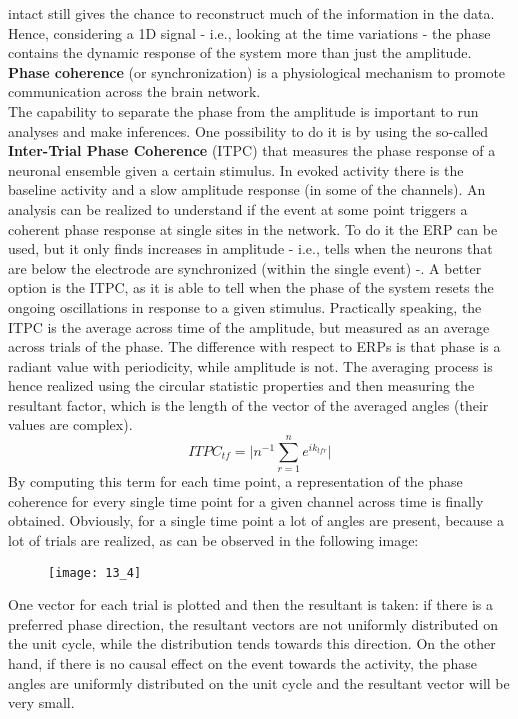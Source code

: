intact still gives the chance to reconstruct much of the information in the data.\\
Hence, considering a 1D signal - i.e., looking at the time variations - the phase
contains the dynamic response of the system more than just the amplitude.
\textbf{Phase coherence} (or synchronization) is a physiological mechanism to promote
communication across the brain network.\\
The capability to separate the phase from the amplitude is important to run analyses
and make inferences.
One possibility to do it is by using the so-called \textbf{Inter-Trial Phase Coherence}
(ITPC) that measures the phase response of a neuronal ensemble given a certain stimulus.
In evoked activity there is the baseline activity and a slow amplitude response (in
some of the channels). An analysis can be realized to understand if the event at some
point triggers a coherent phase response at single sites in the network.
To do it the ERP can be used, but it only finds increases in amplitude - i.e., tells
when the neurons that are below the electrode are synchronized (within the single
event) -. A better option is the ITPC, as it is able to tell when the phase of the
system resets the ongoing oscillations in response to a given stimulus.
Practically speaking, the ITPC is the average across time of the amplitude, but
measured as an average across trials of the phase. The difference with respect to ERPs
is that phase is a radiant value with periodicity, while amplitude is not.
The averaging process is hence realized using the circular statistic properties and
then measuring the resultant factor, which is the length of the vector of the
averaged angles (their values are complex).
\begin{equation*}
    ITPC_{tf}=\biggl|n^{-1}\sum_{r=1}^ne^{ik_{tfr}}\biggr|
\end{equation*}
By computing this term for each time point, a representation of the phase coherence
for every single time point for a given channel across time is finally obtained.
Obviously, for a single time point a lot of angles are present, because a lot of
trials are realized, as can be observed in the following image:
\begin{figure}[H]
    \centering
    \texttt{[image: 13\_4]}
\end{figure}
One vector for each trial is plotted and then the resultant is taken: if there is a
preferred phase direction, the resultant vectors are not uniformly distributed on the
unit cycle, while the distribution tends towards this direction.
On the other hand, if there is no causal effect on the event towards the activity,
the phase angles are uniformly distributed on the unit cycle and
the resultant vector will be very small.

